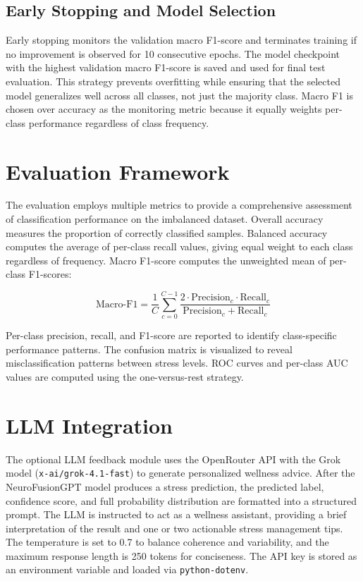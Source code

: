 \documentclass[12pt,letterpaper]{report}
\begin{document}
\subsection{Early Stopping and Model Selection}
\label{subsec:early_stopping}

Early stopping monitors the validation macro F1-score and terminates training if no improvement is observed for 10 consecutive epochs. The model checkpoint with the highest validation macro F1-score is saved and used for final test evaluation. This strategy prevents overfitting while ensuring that the selected model generalizes well across all classes, not just the majority class. Macro F1 is chosen over accuracy as the monitoring metric because it equally weights per-class performance regardless of class frequency.

\section{Evaluation Framework}
\label{sec:eval_framework}

The evaluation employs multiple metrics to provide a comprehensive assessment of classification performance on the imbalanced dataset. Overall accuracy measures the proportion of correctly classified samples. Balanced accuracy computes the average of per-class recall values, giving equal weight to each class regardless of frequency. Macro F1-score computes the unweighted mean of per-class F1-scores:

\begin{equation}
\label{eq:macro_f1}
\text{Macro-F1} = \frac{1}{C}\sum_{c=0}^{C-1} \frac{2 \cdot \text{Precision}_c \cdot \text{Recall}_c}{\text{Precision}_c + \text{Recall}_c}
\end{equation}

Per-class precision, recall, and F1-score are reported to identify class-specific performance patterns. The confusion matrix is visualized to reveal misclassification patterns between stress levels. ROC curves and per-class AUC values are computed using the one-versus-rest strategy.

\section{LLM Integration}
\label{sec:llm_integration}

The optional LLM feedback module uses the OpenRouter API with the Grok model (\texttt{x-ai/grok-4.1-fast}) to generate personalized wellness advice. After the NeuroFusionGPT model produces a stress prediction, the predicted label, confidence score, and full probability distribution are formatted into a structured prompt. The LLM is instructed to act as a wellness assistant, providing a brief interpretation of the result and one or two actionable stress management tips. The temperature is set to 0.7 to balance coherence and variability, and the maximum response length is 250 tokens for conciseness. The API key is stored as an environment variable and loaded via \texttt{python-dotenv}.
\end{document}

